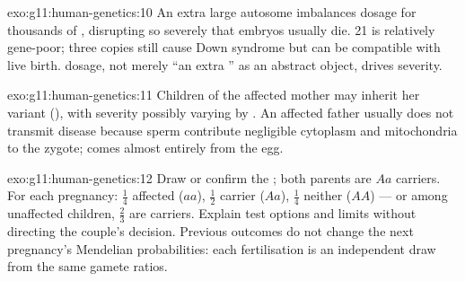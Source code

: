 \begin{solution}{exo:g11:human-genetics:10}
An extra large autosome imbalances dosage for thousands of , disrupting
 so severely that embryos usually die.  21 is relatively
gene-poor; three copies still cause Down syndrome but can be compatible with
live birth.  dosage, not merely ``an extra '' as an abstract
object, drives severity.
\end{solution}

\begin{solution}{exo:g11:human-genetics:11}
Children of the affected mother may inherit her  variant (), with severity possibly varying by . An affected
father usually does not transmit  disease because sperm contribute
negligible cytoplasm and mitochondria to the zygote;  comes almost
entirely from the egg.
\end{solution}

\begin{solution}{exo:g11:human-genetics:12}
Draw or confirm the ; both parents are $Aa$ carriers. For each
pregnancy: $\tfrac14$ affected ($aa$), $\tfrac12$ carrier ($Aa$), $\tfrac14$
neither ($AA$) --- or among unaffected children, $\tfrac23$ are carriers.
Explain test options and limits without directing the couple's decision.
Previous outcomes do not change the next pregnancy's Mendelian probabilities:
each fertilisation is an independent draw from the same gamete ratios.
\end{solution}

